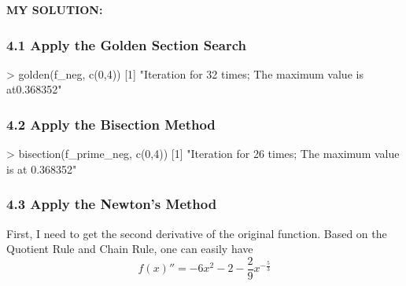 \documentclass[
]{article}
\newenvironment{Shaded}{\begin{snugshade}}{\end{snugshade}}
\newcommand{\DecValTok}[1]{\textcolor[rgb]{0.00,0.00,0.81}{#1}}
\newcommand{\FunctionTok}[1]{\textcolor[rgb]{0.00,0.00,0.00}{#1}}
\newcommand{\NormalTok}[1]{#1}
\newcommand{\SpecialCharTok}[1]{\textcolor[rgb]{0.00,0.00,0.00}{#1}}
\newcommand{\StringTok}[1]{\textcolor[rgb]{0.31,0.60,0.02}{#1}}
\begin{document}
\textbf{MY SOLUTION:}

\hypertarget{apply-the-golden-section-search}{%
\subsubsection{4.1 Apply the Golden Section
Search}\label{apply-the-golden-section-search}}

\begin{Shaded}
\begin{Highlighting}[]
\SpecialCharTok{\textgreater{}} \FunctionTok{golden}\NormalTok{(f\_neg, }\FunctionTok{c}\NormalTok{(}\DecValTok{0}\NormalTok{,}\DecValTok{4}\NormalTok{))}
\NormalTok{[}\DecValTok{1}\NormalTok{] }\StringTok{"Iteration for 32 times; The maximum value is at0.368352"}
\end{Highlighting}
\end{Shaded}

\hypertarget{apply-the-bisection-method}{%
\subsubsection{4.2 Apply the Bisection
Method}\label{apply-the-bisection-method}}

\begin{Shaded}
\begin{Highlighting}[]
\SpecialCharTok{\textgreater{}} \FunctionTok{bisection}\NormalTok{(f\_prime\_neg, }\FunctionTok{c}\NormalTok{(}\DecValTok{0}\NormalTok{,}\DecValTok{4}\NormalTok{))}
\NormalTok{[}\DecValTok{1}\NormalTok{] }\StringTok{"Iteration for 26 times; The maximum value is at 0.368352"}
\end{Highlighting}
\end{Shaded}

\hypertarget{apply-the-newtons-method}{%
\subsubsection{4.3 Apply the Newton's
Method}\label{apply-the-newtons-method}}

First, I need to get the second derivative of the original function.
Based on the Quotient Rule and Chain Rule, one can easily have
\[f(x)''= -6x^2-2-\frac{2}{9}x^{-\frac{5}{3}}\]
\end{document}
